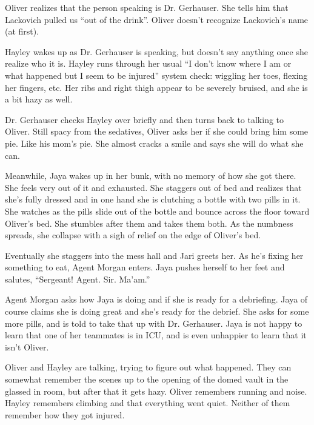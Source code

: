 Oliver realizes that the person speaking is Dr. Gerhauser.  She tells him that Lackovich pulled us ``out of the drink''.  Oliver doesn't recognize Lackovich's name (at first).



Hayley wakes up as Dr. Gerhauser is speaking, but doesn't say anything once she realize who it is.  Hayley runs through her usual ``I don't know where I am or what happened but I seem to be injured'' system check: wiggling her toes, flexing her fingers, etc.  Her ribs and right thigh appear to be severely bruised, and she is a bit hazy as well.



Dr. Gerhauser checks Hayley over briefly and then turns back to talking to Oliver.  Still spacy from the sedatives, Oliver asks her if she could bring him some pie.  Like his mom's pie.  She almost cracks a smile and says she will do what she can.



Meanwhile, Jaya wakes up in her bunk, with no memory of how she got there.  She feels very out of it and exhausted.  She staggers out of bed and realizes that she's fully dressed and in one hand she is clutching a bottle with two pills in it. She watches as the pills slide out of the bottle and bounce across the floor toward Oliver's bed.  She stumbles after them and takes them both.  As the numbness spreads, she collapse with a sigh of relief on the edge of Oliver's bed.



Eventually she staggers into the mess hall and Jari greets her.  As he's fixing her something to eat, Agent Morgan enters.  Jaya pushes herself to her feet and salutes, ``Sergeant!  Agent.  Sir.  Ma'am.''



Agent Morgan asks how Jaya is doing and if she is ready for a debriefing.  Jaya of course claims she is doing great and she's ready for the debrief.  She asks for some more pills, and is told to take that up with Dr. Gerhauser.  Jaya is not happy to learn that one of her teammates is in ICU, and is even unhappier to learn that it isn't Oliver.  



Oliver and Hayley are talking, trying to figure out what happened.  They can somewhat remember the scenes up to the opening of the domed vault in the glassed in room, but after that it gets hazy.  Oliver remembers running and noise.  Hayley remembers climbing and that everything went quiet.  Neither of them remember how they got injured.



